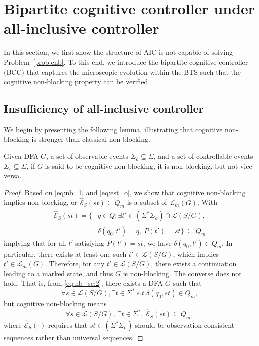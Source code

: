 \documentclass[journal,twoside,web]{ieeecolor}
\begin{document}


\section{Bipartite cognitive controller under all-inclusive controller}\label{sec:bcc}

In this section, we first show the structure of AIC is not capable of solving Problem~\ref{prob:cnb}. 
To this end, we introduce the bipartite cognitive controller (BCC) that captures the microscopic evolution within the BTS such that the cognitive non-blocking property can be verified.

\subsection{Insufficiency of all-inclusive controller}

We begin by presenting the following lemma, illustrating that cognitive non-blocking is stronger than classical non-blocking.

\begin{lemma}
    Given DFA $G$, a set of observable events $\Sigma_o \subseteq \Sigma$, and a set of controllable events $\Sigma_c \subseteq \Sigma$, if $G$ is said to be cognitive non-blocking, it is non-blocking, but not vice versa.
    \label{lem:cnb_nb}
\end{lemma}
\begin{proof}
    Based on \eqref{eq:nb_1} and \eqref{eq:est_o}, we show that cognitive non-blocking implies non-blocking, or
    $\hat{\mathcal{E}}_S(st) \subseteq Q_m$ is a subset of $\mathcal{L}_m(G)$.
    With 
    $$
    \begin{aligned}
    \hat{\mathcal{E}}_S(st) = \{& q \in Q : \exists t' \in (\Sigma^*\Sigma_o) \cap \mathcal{L}(S/G), \\
                                &\delta(q_0,t') = q,\ P(t') = st \} \, \subseteq \, Q_m
    \end{aligned}
    $$ 
    implying that for all $t'$ satisfying $P(t') = st$, we have
    $
    \delta(q_0, t') \in Q_m.
    $
    In particular, there exists at least one such $t' \in \mathcal{L}(S/G)$, which implies
    $
    t' \in \mathcal{L}_m(G).
    $
    Therefore, for any $t' \in \mathcal{L}(S/G)$, there exists a continuation leading to a marked state, and thus $G$ is non-blocking.
    The converse does not hold. That is, from \eqref{eq:nb_sc:2}, there exists a DFA $G$ such that
    $$
        \forall s \in \mathcal{L}(S/G), \exists t \in \Sigma^* \ s.t. \delta(q_0, st) \in Q_m,
    $$
    but cognitive non-blocking means
    $$
        \forall s \in \mathcal{L}(S/G), \ \exists t \in \Sigma^*, \ 
        \hat{\mathcal{E}}_S(st) \subseteq Q_m,
    $$
    where $\hat{\mathcal{E}}_S(\cdot)$ requires that $st \in (\Sigma^*\Sigma_o)$ should be observation-consistent sequences rather than universal sequences.
\end{proof}
\end{document}

